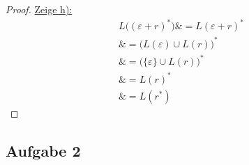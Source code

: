 \begin{proof}
	\underline{Zeige h):}
	\begin{align*}
		L\big((\varepsilon+r)^\ast\big)
		\overset{\text{}}&=
		L(\varepsilon+r)^\ast\\
		\overset{\text{}}&=
		\big(L(\varepsilon)\cup L(r)\big)^\ast\\
		\overset{\text{}}&=
		\big(\lbrace\varepsilon\rbrace\cup L(r)\big)^\ast\\
		\overset{\text{}}&=
		L(r)^\ast\\
		\overset{\text{}}&=
		L(r^\ast)
	\end{align*}
\end{proof}

\subsection{Aufgabe 2}

